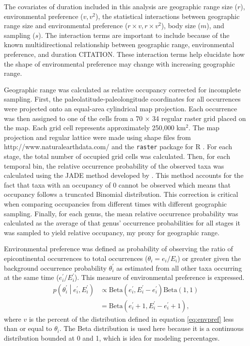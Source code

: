 \documentclass{article}
\begin{document}
The covariates of duration included in this analysis are geographic range size (\(r\)), environmental preference (\(v, v^{2}\)), the statistical interactions between geographic range size and environmental preference (\(r \times v, r \times v^{2}\)), body size (\(m\)), and sampling (\(s\)). The interaction terms are important to include because of the known multidirectional relationship between geographic range, environmental preference, and duration CITATION. These interaction terms help elucidate how the shape of environmental preference may change with increasing geographic range.

Geographic range was calculated as relative occupancy corrected for incomplete sampling. First, the paleolatitude-paleolongitude coordinates for all occurrences were projected onto an equal-area cylindrical map projection. Each occurrence was then assigned to one of the cells from a 70 \(\times\) 34 regular raster grid placed on the map. Each grid cell represents approximately 250,000 km\(^{2}\). The map projection and regular lattice were made using shape files from http://www.naturalearthdata.com/ and the \texttt{raster} package for R \citep{raster}. For each stage, the total number of occupied grid cells was calculated. Then, for each temporal bin, the relative occurrence probability of the observed taxa was calculated using the \uppercase{jade} method developed by \citet{Chao2015a}. This method accounts for the fact that taxa with an occupancy of 0 cannot be observed which means that occupancy follows a truncated Binomial distribution. This correction is critical when comparing occupancies from different times with different geographic sampling. Finally, for each genus, the mean relative occurrence probability was calculated as the average of that genus' occurrence probabilities for all stages it was sampled to yield relative occupancy, my proxy for geographic range.

Environmental preference was defined as probability of observing the ratio of epicontinental occurrences to total occurrences (\(\theta_{i} = e_{i} / E_{i}\)) or greater given the background occurrence probability \(\theta^{\prime}_{i}\) as estimated from all other taxa occurring at the same time (\(e^{\prime}_{i} / E^{\prime}_{i}\)). This measure of environmental preference is expressed.
\begin{equation}
  \begin{aligned}
    p\left(\theta^{\prime}_{i} \middle| e^{\prime}_{i}, E^{\prime}_{i} \right) &\propto \mathrm{Beta}(e^{\prime}_{i}, E^{\prime}_{i} - e^{\prime}_{i}) \mathrm{Beta}(1, 1) \\
    &= \mathrm{Beta}(e^{\prime}_{i} + 1, E^{\prime}_{i} - e^{\prime}_{i} + 1),
  \end{aligned}
  \label{eq:envpref}
\end{equation}
where \(v\) is the percent of the distribution defined in equation \ref{eq:envpref} less than or equal to \(\theta_{i}\). The Beta distribution is used here because it is a continuous distribution bounded at 0 and 1, which is idea for modeling percentages.
\end{document}

